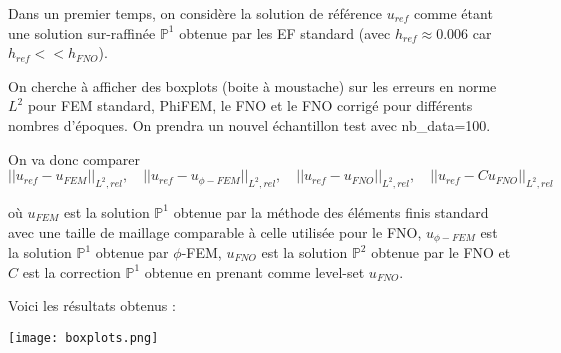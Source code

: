 Dans un premier temps, on considère la solution de référence $u_{ref}$ comme étant une solution sur-raffinée $\mathbb{P}^1$ obtenue par les EF standard (avec $h_{ref}\approx 0.006$ car $h_{ref}<<h_{FNO}$). 

On cherche à afficher des boxplots (boite à moustache) sur les erreurs en norme $L^2$ pour FEM standard, PhiFEM, le FNO et le FNO corrigé pour différents nombres d'époques. On prendra un nouvel échantillon test avec nb\_data=100. 

On va donc comparer
$$||u_{ref}-u_{FEM}||_{L^2,rel}, \quad ||u_{ref}-u_{\phi-FEM}||_{L^2,rel}, \quad ||u_{ref}-u_{FNO}||_{L^2,rel}, \quad ||u_{ref}-Cu_{FNO}||_{L^2,rel}$$

où $u_{FEM}$ est la solution $\mathbb{P}^1$ obtenue par la méthode des éléments finis standard avec une taille de maillage comparable à celle utilisée pour le FNO, $u_{\phi-FEM}$ est la solution $\mathbb{P}^1$ obtenue par $\phi$-FEM, $u_{FNO}$ est la solution $\mathbb{P}^2$ obtenue par le FNO et $C$ est la correction $\mathbb{P}^1$ obtenue en prenant comme level-set $u_{FNO}$.

Voici les résultats obtenus :

\begin{minipage}{\linewidth}
	\centering
	\texttt{[image: boxplots.png]}
\end{minipage}

